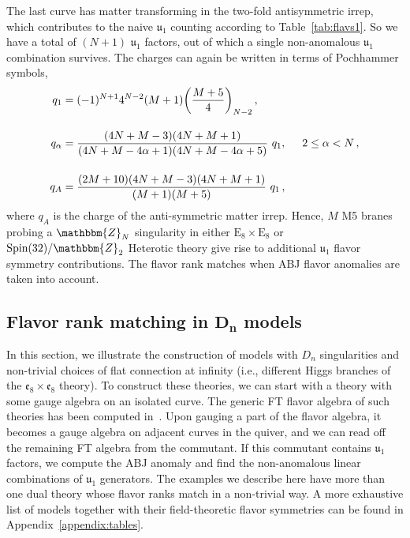 \documentclass[11pt]{article}
\numberwithin{equation}{section}
\newcommand{\fu}{\mathfrak{u}}
\begin{document}
The last curve has matter transforming in the two-fold antisymmetric irrep, which contributes to the naive $\fu_1$ counting according to Table~\ref{tab:flavs1}. So we have a total of $(N+1)$ $\fu_1$ factors, out of which a single non-anomalous $\fu_1$ combination survives. The charges can again be written in terms of Pochhammer symbols, 
\begin{align}
\begin{split}
q_{1}&=(-1)^{N+1}4^{N-2}(M+1)\bigg(\frac{M+5}{4}\bigg)_{N-2}\,, \\[10pt]
q_{\alpha}&=\frac{(4N+M-3)(4N+M+1)}{(4N+M-4\alpha+1)(4N+M-4\alpha+5)}~q_{1}, \hspace{0.5cm} 2 \leq \alpha<N\,, \\[12pt]
q_{A}&=\frac{(2M+10)(4N+M-3)(4N+M+1)}{(M+1)(M+5)}~q_{1}\,,
\end{split}
\end{align}
where $q_{A}$ is the charge of the anti-symmetric matter irrep.  Hence, $M$ M5 branes probing a $\mathbbm{Z}_N$ singularity in either $\text{E}_8\times \text{E}_8$ or $\text{Spin}(32)/
\mathbbm{Z}_2$ Heterotic theory give rise to additional $\fu_1$ flavor symmetry contributions. The flavor rank matches when ABJ flavor anomalies are taken into account.


\subsection[Flavor rank matching in \texorpdfstring{$D_{n}$}{Dn} models]{Flavor rank matching in \texorpdfstring{$\boldsymbol{D_{n}}$}{Dn} models}
In this section, we illustrate the construction of models with $D_{n}$ singularities and non-trivial choices of flat connection at infinity (i.e., different Higgs branches of the $\mathfrak{e}_{8} \times \mathfrak{e}_{8}$ theory). To construct these theories, we can start with a theory with some gauge algebra on an isolated curve. The generic FT flavor algebra of such theories has been computed in~\cite{Bertolini:2015bwa,Johnson:2016qar}. Upon gauging a part of the flavor algebra, it becomes a gauge algebra on adjacent curves in the quiver, and we can read off the remaining FT algebra from the commutant. If this commutant contains $\fu_1$ factors, we compute the ABJ anomaly and find the non-anomalous linear combinations of $\fu_1$ generators. The examples we describe here have more than one dual theory whose flavor ranks match in a non-trivial way. A more exhaustive list of models together with their field-theoretic flavor symmetries can be found in Appendix~\ref{appendix:tables}.
\end{document}
